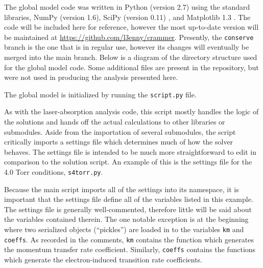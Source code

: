 The global model code was written in Python (version 2.7) using the standard
libraries, NumPy (version 1.6), SciPy (version 0.11) \cite{Jones2001}, and
Matplotlib 1.3 \cite{Hunter2007}. The code will be included here for reference,
however the most up-to-date version will be maintained at
\url{https://github.com/l3enny/crammer}. Presently, the \texttt{conserve} branch
is the one that is in regular use, however its changes will eventually be merged
into the main branch. Below is a diagram of the directory structure used for the
global model code. Some additional files are present in the repository, but were
not used in producing the analysis presented here.

{
}

The global model is initialized by running the \texttt{script.py} file.
\begin{singlespace}
  
\end{singlespace}
As with the laser-absorption analysis code, this script mostly handles the logic
of the solutions and hands off the actual calculations to other libraries or
submodules. Aside from the importation of several submodules, the script
critically imports a settings file which determines much of how the solver
behaves. The settings file is intended to be much more straightforward to edit
in comparison to the solution script. An example of this is the settings file
for the 4.0 Torr conditions, \texttt{s4torr.py}.
\begin{singlespace}
  
\end{singlespace}
Because the main script imports all of the settings into its namespace, it is
important that the settings file define all of the variables listed in this
example. The settings file is generally well-commented, therefore little will be
said about the variables contained therein. The one notable exception is at the
beginning where two serialized objects (``pickles'') are loaded in to the
variables \texttt{km} and \texttt{coeffs}. As recorded in the comments,
\texttt{km} contains the function which generates the momentum transfer rate
coefficient. Similarly, \texttt{coeffs} contains the functions which generate
the electron-induced transition rate coefficients.


